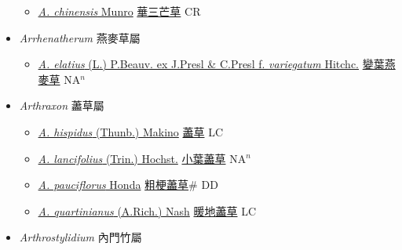 \begin{itemize}
  \begin{itemize}
        \item[] \href{http://www.theplantlist.org/tpl1.1/search?q=Aristida+chinensis}{\textit{A. chinensis} Munro}   \href{\detokenize{http://taibnet.sinica.edu.tw/chi/taibnet_species_list.php?T2=華三芒草&T2_new_value=true&fr=y}}{華三芒草} CR
  \end{itemize}
 \item[] \textit{Arrhenatherum} 燕麥草屬
                    
  \begin{itemize}
        \item[] \href{http://www.theplantlist.org/tpl1.1/search?q=Arrhenatherum+elatius+ f. +variegatum}{\textit{A. elatius} (L.) P.Beauv. ex J.Presl \& C.Presl  f.  \textit{variegatum} Hitchc.}   \href{\detokenize{http://taibnet.sinica.edu.tw/chi/taibnet_species_list.php?T2=變葉燕麥草&T2_new_value=true&fr=y}}{變葉燕麥草} NA$^n$
  \end{itemize}
 \item[] \textit{Arthraxon} 藎草屬
                    
  \begin{itemize}
        \item[] \href{http://www.theplantlist.org/tpl1.1/search?q=Arthraxon+hispidus}{\textit{A. hispidus} (Thunb.) Makino}   \href{\detokenize{http://taibnet.sinica.edu.tw/chi/taibnet_species_list.php?T2=藎草&T2_new_value=true&fr=y}}{藎草} LC
        \item[] \href{http://www.theplantlist.org/tpl1.1/search?q=Arthraxon+lancifolius}{\textit{A. lancifolius} (Trin.) Hochst.}   \href{\detokenize{http://taibnet.sinica.edu.tw/chi/taibnet_species_list.php?T2=小葉藎草&T2_new_value=true&fr=y}}{小葉藎草} NA$^n$
        \item[] \href{http://www.theplantlist.org/tpl1.1/search?q=Arthraxon+pauciflorus}{\textit{A. pauciflorus} Honda}   \href{\detokenize{http://taibnet.sinica.edu.tw/chi/taibnet_species_list.php?T2=粗梗藎草&T2_new_value=true&fr=y}}{粗梗藎草}\# DD
        \item[] \href{http://www.theplantlist.org/tpl1.1/search?q=Arthraxon+quartinianus}{\textit{A. quartinianus} (A.Rich.) Nash}   \href{\detokenize{http://taibnet.sinica.edu.tw/chi/taibnet_species_list.php?T2=暖地藎草&T2_new_value=true&fr=y}}{暖地藎草} LC
  \end{itemize}
 \item[] \textit{Arthrostylidium} 內門竹屬
                    

\end{itemize}
